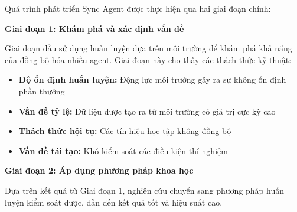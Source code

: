 
Quá trình phát triển Sync Agent được thực hiện qua hai giai đoạn chính:

\textbf{Giai đoạn 1: Khám phá và xác định vấn đề}

Giai đoạn đầu sử dụng huấn luyện dựa trên môi trường để khám phá khả năng của
đồng bộ hóa nhiều agent. Giai đoạn này cho thấy các thách thức kỹ thuật:

\begin{itemize}
    \item \textbf{Độ ổn định huấn luyện:} Động lực môi trường gây ra sự không ổn định phần thưởng
    \item \textbf{Vấn đề tỷ lệ:} Dữ liệu được tạo ra từ môi trường có giá trị cực kỳ cao
    \item \textbf{Thách thức hội tụ:} Các tín hiệu học tập không đồng bộ
    \item \textbf{Vấn đề tái tạo:} Khó kiểm soát các điều kiện thí nghiệm
\end{itemize}

\textbf{Giai đoạn 2: Áp dụng phương pháp khoa học}

Dựa trên kết quả từ Giai đoạn 1, nghiên cứu chuyển sang phương pháp huấn luyện kiểm soát
được, dẫn đến kết quả tốt và hiệu suất cao.

